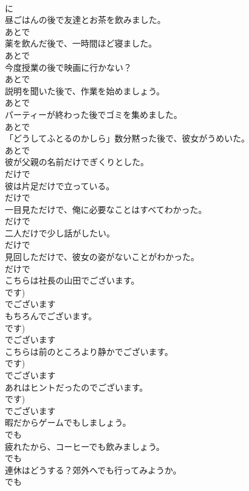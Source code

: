 \documentclass[8pt]{extreport}
\begin{document}
\begin{CJK}{UTF8}{min}
\\	に
\\	昼ごはんの後で友達とお茶を飲みました。	
\\	あとで
\\	薬を飲んだ後で、一時間ほど寝ました。	
\\	あとで
\\	今度授業の後で映画に行かない？	
\\	あとで
\\	説明を聞いた後で、作業を始めましょう。	
\\	あとで
\\	パーティーが終わった後でゴミを集めました。	
\\	あとで
\\	「どうしてふとるのかしら」数分黙った後で、彼女がうめいた。	
\\	あとで
\\	彼が父親の名前だけでぎくりとした。	
\\	だけで
\\	彼は片足だけで立っている。	
\\	だけで
\\	一目見ただけで、俺に必要なことはすべてわかった。	
\\	だけで
\\	二人だけで少し話がしたい。	
\\	だけで
\\	見回しただけで、彼女の姿がないことがわかった。	
\\	だけで
\\	こちらは社長の山田でございます。	
\\	です)	
\\	でございます
\\	もちろんでございます。	
\\	です)	
\\	でございます
\\	こちらは前のところより静かでございます。	
\\	です)	
\\	でございます
\\	あれはヒントだったのでございます。	
\\	です)	
\\	でございます
\\	暇だからゲームでもしましょう。	
\\	でも
\\	疲れたから、コーヒーでも飲みましょう。	
\\	でも
\\	連休はどうする？郊外へでも行ってみようか。	
\\	でも

\end{CJK}
\end{document}
